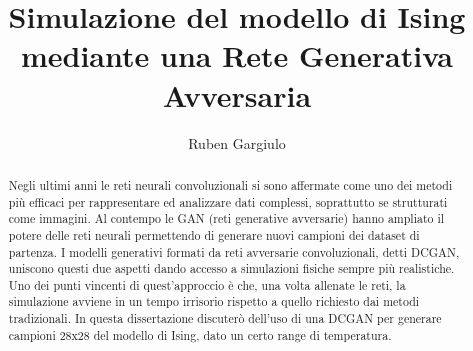 \documentclass[Lau, noexaminfo, oneside]{sapthesis} %
\title{Simulazione del modello di Ising mediante una Rete Generativa Avversaria}
\author{Ruben Gargiulo}
\date{}
\begin{document}
\frontmatter
\maketitle

\begin{abstract}
Negli ultimi anni le reti neurali convoluzionali si sono affermate come uno dei metodi più efficaci per rappresentare ed analizzare dati complessi, soprattutto se strutturati come immagini. Al contempo le GAN (reti generative avversarie) hanno ampliato il potere delle reti neurali permettendo di generare nuovi campioni dei dataset di partenza.
I modelli generativi formati da reti avversarie convoluzionali, detti DCGAN, uniscono questi due aspetti dando accesso a simulazioni fisiche sempre più realistiche. Uno dei punti vincenti di quest'approccio è che, una volta allenate le reti, la simulazione avviene in un tempo irrisorio rispetto a quello richiesto dai metodi tradizionali. In questa dissertazione discuterò dell'uso di una DCGAN per generare campioni 28x28 del modello di Ising, dato un certo range di temperatura.
\end{abstract}
\tableofcontents
\mainmatter
\end{document}
